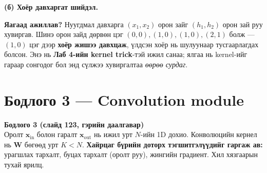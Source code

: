 \documentclass[11pt]{article}
\newenvironment{problem}[2][Бодлого]
    { \begin{mdframed}[backgroundcolor=gray!20] \textbf{#1 #2} \\}
    { \end{mdframed}}
\newenvironment{solution}[1][\textbf{Бодолт.}]
    { \noindent #1 \smallskip \\ }
    { \medskip }
\newcommand{\xin}{\mathbf{x}_{\mathrm{in}}}
\newcommand{\xout}{\mathbf{x}_{\mathrm{out}}}
\begin{document}
\begin{solution}[\textbf{(б) Хоёр давхаргат шийдэл.}]
\medskip
\begin{mdframed}[backgroundcolor=green!10]
\textbf{Яагаад ажиллав?} Нуугдмал давхарга $(x_1,x_2)$ орон зайг $(h_1,h_2)$ орон зай
руу хувиргав. Шинэ орон зайд дөрвөн цэг $(0,0), (1,0), (1,0), (2,1)$ болж — $(1,0)$ цэг
дээр \textbf{хоёр жишээ давхцаж}, үлдсэн хоёр нь шулуунаар тусгаарлагдах болсон.
Энэ нь \textbf{Лаб 4-ийн kernel trick}-тэй ижил санаа; ялгаа нь kernel-ийг гараар
сонгодог бол энд сүлжээ хувиргалтаа \emph{өөрөө сурдаг}.
\end{mdframed}
\end{solution}

\section{Бодлого 3 — Convolution module}

\begin{problem}{3 (слайд 123, гэрийн даалгавар)}
Оролт $\xin$ болон гаралт $\xout$ нь ижил урт $N$-ийн 1D дохио. Конволюцийн кернел нь
$\mathbf{W}$ бөгөөд урт $K < N$.
\textbf{Хайрцаг бүрийн доторх тэгшитгэлүүдийг гаргаж ав:} урагшлах тархалт,
буцах тархалт (оролт руу), жингийн градиент. Хил хязгаарын тухай ярилц.
\end{problem}
\end{document}
